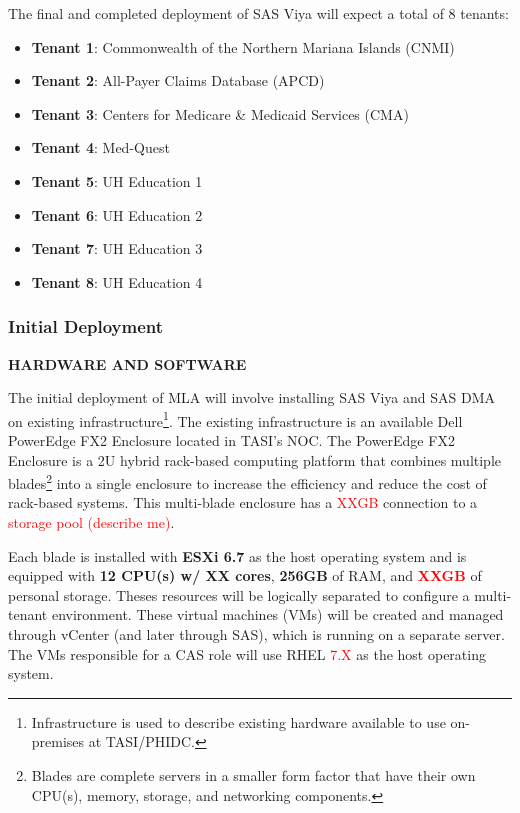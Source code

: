 The final and completed deployment of SAS Viya will expect a total of 8 tenants:

\begin{itemize}
    \item \textbf{Tenant 1}: Commonwealth of the Northern Mariana Islands (CNMI)
    \item \textbf{Tenant 2}: All-Payer Claims Database (APCD)
    \item \textbf{Tenant 3}: Centers for Medicare \& Medicaid Services (CMA)
    \item \textbf{Tenant 4}: Med-Quest
    \item \textbf{Tenant 5}: UH Education 1
    \item \textbf{Tenant 6}: UH Education 2
    \item \textbf{Tenant 7}: UH Education 3
    \item \textbf{Tenant 8}: UH Education 4
\end{itemize}

\subsubsection{Initial Deployment}
\textbf{HARDWARE AND SOFTWARE}

The initial deployment of MLA will involve installing SAS Viya and SAS DMA on existing infrastructure\footnote{Infrastructure is used to describe existing hardware available to use on-premises at TASI/PHIDC.}. The existing infrastructure is  an available Dell PowerEdge FX2 Enclosure located in TASI's NOC. The PowerEdge FX2 Enclosure is a 2U hybrid rack-based computing platform that combines multiple blades\footnote{Blades are complete servers in a smaller form factor that have their own CPU(s), memory, storage, and networking components.} into a single enclosure to increase the efficiency and reduce the cost of rack-based systems. This multi-blade enclosure has a \textcolor{red}{XXGB} connection to a \textcolor{red}{storage pool (describe me)}.

Each blade is installed with \textbf{ESXi 6.7} as the host operating system and is equipped with \textbf{12 CPU(s) w/ XX cores}, \textbf{256GB} of RAM, and \textcolor{red}{\textbf{XXGB}} of personal storage. Theses resources will be logically separated to configure a multi-tenant environment. These virtual machines (VMs) will be created and managed through vCenter (and later through SAS), which is running on a separate server. The VMs responsible for a CAS role will use RHEL \textcolor{red}{7.X} as the host operating system. 

